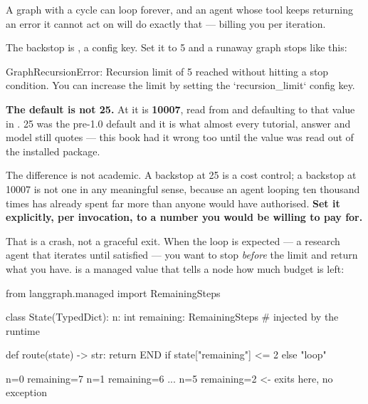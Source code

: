 A graph with a cycle can loop forever, and an agent whose tool keeps returning an
error it cannot act on will do exactly that --- billing you per iteration.

The backstop is , a config key. Set it to 5 and a runaway
graph stops like this:

\begin{console}
GraphRecursionError: Recursion limit of 5 reached without hitting a stop
condition. You can increase the limit by setting the `recursion_limit`
config key.
\end{console}

\begin{warning}
\textbf{The default is not 25.} At \lgver{} it is \textbf{10007}, read from
 and defaulting to that value in
. 25 was the pre-1.0 default and it is what
almost every tutorial, answer and model still quotes --- this book had it wrong
too until the value was read out of the installed package.

The difference is not academic. A backstop at 25 is a cost control; a backstop
at 10007 is not one in any meaningful sense, because an agent looping ten
thousand times has already spent far more than anyone would have authorised.
\textbf{Set it explicitly, per invocation, to a number you would be willing to
pay for.}
\end{warning}

That is a crash, not a graceful exit. When the loop is expected --- a research
agent that iterates until satisfied --- you want to stop \emph{before} the limit
and return what you have.  is a managed value that tells a
node how much budget is left:

\begin{python}[caption={Exiting gracefully instead of crashing}, label={lst:remaining-steps}]
from langgraph.managed import RemainingSteps


class State(TypedDict):
    n: int
    remaining: RemainingSteps        # injected by the runtime


def route(state) -> str:
    return END if state["remaining"] <= 2 else "loop"
\end{python}

\begin{console}
n=0 remaining=7
n=1 remaining=6
...
n=5 remaining=2                       <- exits here, no exception
\end{console}

